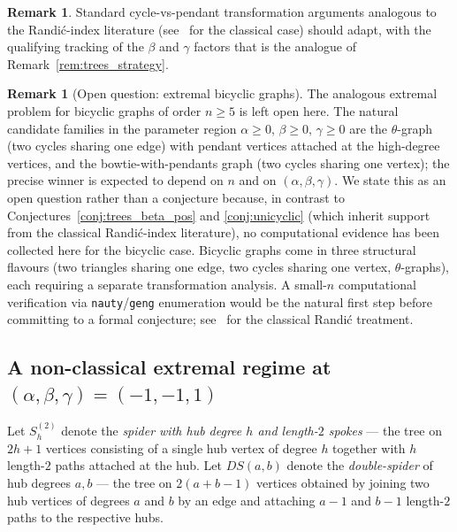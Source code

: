 \documentclass[11pt,a4paper]{article}
\theoremstyle{definition}
\newtheorem{remark}[theorem]{Remark}
\begin{document}
\begin{remark}\label{rem:unicyclic_strategy}
Standard cycle-vs-pendant transformation arguments analogous to the
Randi\'c-index literature
(see~\cite{HansenMelot2003unicyclicRandic} for the classical case)
should adapt, with the qualifying tracking of the $\beta$ and
$\gamma$ factors that is the analogue of
Remark~\ref{rem:trees_strategy}.
\end{remark}

\begin{remark}[Open question: extremal bicyclic graphs]\label{conj:bicyclic}
The analogous extremal problem for bicyclic graphs of order $n \ge 5$
is left open here. The natural candidate families in the parameter
region $\alpha \ge 0,\, \beta \ge 0,\, \gamma \ge 0$ are the
$\theta$-graph (two cycles sharing one edge) with pendant vertices
attached at the high-degree vertices, and the bowtie-with-pendants
graph (two cycles sharing one vertex); the precise winner is
expected to depend on $n$ and on $(\alpha, \beta, \gamma)$. We
state this as an open question rather than a conjecture because, in
contrast to Conjectures~\ref{conj:trees_beta_pos} and
\ref{conj:unicyclic} (which inherit support from the classical
Randi\'c-index literature), no computational evidence has been
collected here for the bicyclic case. Bicyclic graphs come in three
structural flavours (two triangles sharing one edge, two cycles
sharing one vertex, $\theta$-graphs), each requiring a separate
transformation analysis. A small-$n$ computational verification via
\texttt{nauty}/\texttt{geng} enumeration would be the natural first
step before committing to a formal conjecture;
see~\cite{LiuLuTian2008Randic} for the classical Randi\'c
treatment.
\end{remark}

\subsection{A non-classical extremal regime at $(\alpha,\beta,\gamma) = (-1, -1, 1)$}\label{sub:open_caterpillar}

Let $S^{(2)}_{h}$ denote the \emph{spider with hub degree $h$ and
length-$2$ spokes} --- the tree on $2h + 1$ vertices consisting of
a single hub vertex of degree $h$ together with $h$ length-$2$
paths attached at the hub. Let $DS(a, b)$ denote the
\emph{double-spider} of hub degrees $a, b$ --- the tree on
$2(a + b - 1)$ vertices obtained by joining two hub vertices of
degrees $a$ and $b$ by an edge and attaching $a - 1$ and $b - 1$
length-$2$ paths to the respective hubs.
\end{document}

